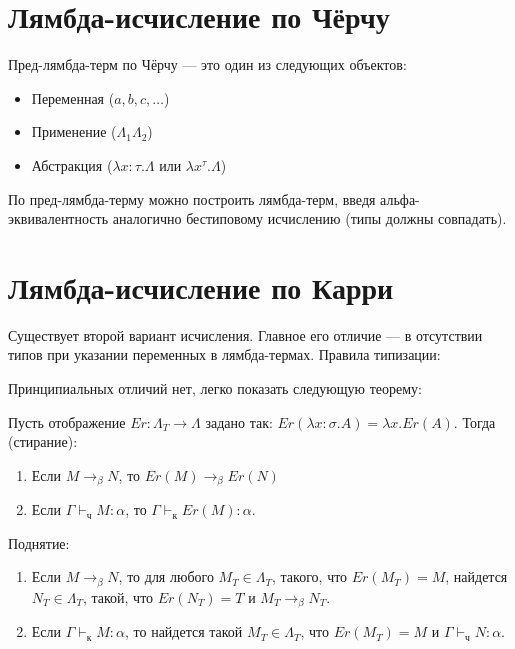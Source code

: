 \section{Лямбда-исчисление по Чёрчу}

\begin{definition}Пред-лямбда-терм по Чёрчу --- это один из следующих объектов:
\begin{itemize}
\item Переменная ($a,b,c,\dots$)
\item Применение ($\Lambda_1 \Lambda_2$)
\item Абстракция ($\lambda x : \tau . \Lambda$ или $\lambda x^\tau . \Lambda$)
\end{itemize}
\end{definition}

По пред-лямбда-терму можно построить лямбда-терм, введя альфа-эквивалентность аналогично 
бестиповому исчислению (типы должны совпадать).

\section{Лямбда-исчисление по Карри}

Существует второй вариант исчисления.
Главное его отличие --- в отсутствии типов при указании переменных в лямбда-термах.
Правила типизации:
 
Принципиальных отличий нет, легко показать следующую теорему:
\begin{theorem}
Пусть отображение $Er: \Lambda_T \rightarrow \Lambda$ задано так:
$Er(\lambda x:\sigma.A) = \lambda x.Er(A)$. Тогда (стирание):

\begin{enumerate}
\item Если $M\rightarrow_\beta N$, то $Er(M)\rightarrow_\beta Er(N)$
\item Если $\Gamma\vdash_\texttt{ч} M:\alpha$, то $\Gamma\vdash_\texttt{к} Er(M):\alpha$.
\end{enumerate}

Поднятие:
\begin{enumerate}
\item Если $M\rightarrow_\beta N$, то для любого $M_T \in \Lambda_T$, такого, что $Er(M_T) = M$,
найдется $N_T \in \Lambda_T$, такой, что $Er(N_T) = T$ и $M_T \rightarrow_\beta N_T$.
\item Если $\Gamma\vdash_\texttt{к} M:\alpha$, то найдется такой $M_T\in\Lambda_T$, 
что $Er(M_T)=M$ и $\Gamma\vdash_\texttt{ч} N:\alpha$.
\end{enumerate}
\end{theorem}

